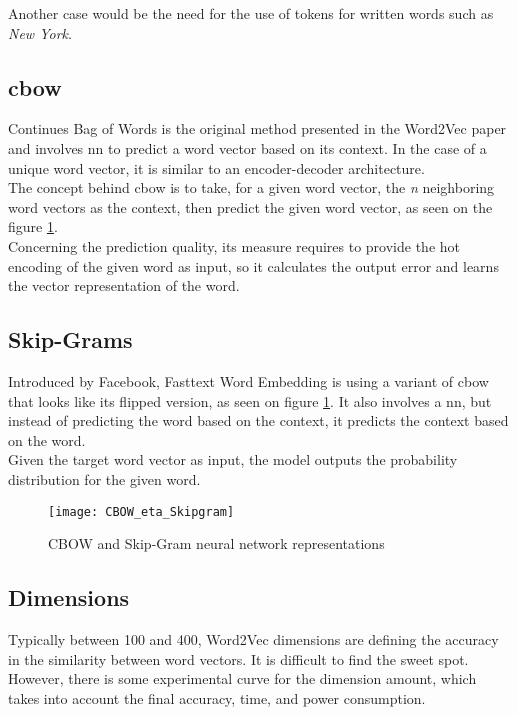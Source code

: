 Another case would be the need for the use of tokens for written words such as \textit{New York}.


\subsection{\gls{cbow}}
\label{analyse:cbow}
Continues Bag of Words is the original method presented in the Word2Vec paper \cite{article:word2vec}  and involves \gls{nn} to predict a word vector based on its context. In the case of a unique word vector, it is similar to an encoder-decoder architecture.\\

The concept behind \gls{cbow} is to take, for a given word vector, the \textit{n} neighboring word vectors as the context, then predict the given word vector, as seen on the figure \ref{fig:wikipedia_cbow_skipgram_img}.\\

Concerning the prediction quality, its measure requires to provide the hot encoding of the given word as input, so it calculates the output error and learns the vector representation of the word.

\subsection{Skip-Grams}
\label{analyse:skip-grams}
Introduced by Facebook, Fasttext\cite{article:fasttext} Word Embedding is using a variant of \gls{cbow} that looks like its flipped version, as seen on figure \ref{fig:wikipedia_cbow_skipgram_img}. It also involves a \gls{nn}, but instead of predicting the word based on the context, it predicts the context based on the word.\\

Given the target word vector as input, the model outputs the probability distribution for the given word.

\begin{figure}[ht!]
    \centering
    \texttt{[image: CBOW\_eta\_Skipgram]}
    \caption{
       CBOW and Skip-Gram neural network representations\cite{wikipedia:cbow_skipgram_img}
    }
    \label{fig:wikipedia_cbow_skipgram_img}
\end{figure}

\subsection{Dimensions}
\label{analyse:dimensions}
Typically between 100 and 400, Word2Vec dimensions are defining the accuracy in the similarity between word vectors. It is difficult to find the sweet spot. However, there is some experimental curve for the dimension amount, which takes into account the final accuracy, time, and power consumption. 


